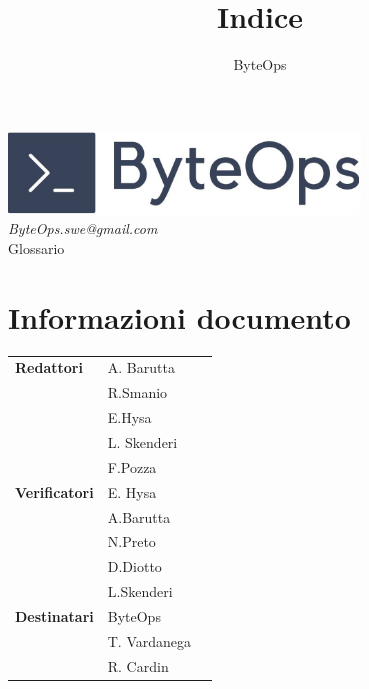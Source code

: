 \documentclass{article}
\title{\textbf{\fontsize{28}{6}\selectfont Indice}}
\author{\fontsize{14}{6}\selectfont ByteOps}
\date{}
\begin{document}
\pagestyle{fancy}
\begin{center}
    \includegraphics[width = 0.7\textwidth]{../Images/logo.png} \\
    \vspace{0.2cm}
    \textcolor[RGB]{60, 60, 60}{\textit{ByteOps.swe@gmail.com}} \\
    \vspace{2cm}
    \fontsize{16}{6}\selectfont Glossario \\
    \vspace{0.5cm}
\end{center}

\section*{Informazioni documento}
\def\arraystretch{1.2}
\begin{tabular}{>{\raggedleft\arraybackslash}p{}|>{\raggedright\arraybackslash}p{}c}
    \hline
    \addlinespace 
    \textbf{Redattori}    & A. Barutta\\ & R.Smanio\\ & E.Hysa\\ & L. Skenderi\\ & F.Pozza \vspace{10pt} \\
    \textbf{Verificatori} & E. Hysa\\ & A.Barutta\\ & N.Preto\\ & D.Diotto\\ & L.Skenderi \vspace{10pt} \\
    \textbf{Destinatari}  & ByteOps\\ & T. Vardanega \\ & R. Cardin \vspace{10pt} \\
\end{tabular}

\pagebreak 

\end{document}
